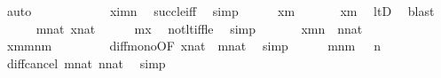 \begin{isabellebody}
\ auto\isanewline
\ \ \ \ \isamarkupfalse%
\ \isanewline
\ \ \ \ \isamarkupfalse%
\ {\isachardoublequoteopen}x{\isacharhash}{\kern0pt}{\isacharplus}{\kern0pt}i{\isacharless}{\kern0pt}m{\isacharhash}{\kern0pt}{\isacharplus}{\kern0pt}n{\isachardoublequoteclose}\ \isamarkupfalse%
\ succ{\isacharunderscore}{\kern0pt}le{\isacharunderscore}{\kern0pt}iff\ \isamarkupfalse%
\ simp\isanewline
\ \ \ \ \isamarkupfalse%
\ {\isacartoucheopen}x{\isasymnotin}m{\isacartoucheclose}\ \isanewline
\ \ \ \ \isamarkupfalse%
\ {\isachardoublequoteopen}{\isasymnot}x{\isacharless}{\kern0pt}m{\isachardoublequoteclose}\ \isamarkupfalse%
\ ltD\ \isamarkupfalse%
\ blast\isanewline
\ \ \ \ \isamarkupfalse%
\ {\isacartoucheopen}m{\isasymin}nat{\isacartoucheclose}\ {\isacartoucheopen}x{\isasymin}nat{\isacartoucheclose}\isanewline
\ \ \ \ \isamarkupfalse%
\ {\isachardoublequoteopen}m{\isasymle}x{\isachardoublequoteclose}\ \isamarkupfalse%
\ not{\isacharunderscore}{\kern0pt}lt{\isacharunderscore}{\kern0pt}iff{\isacharunderscore}{\kern0pt}le\ \isamarkupfalse%
\ simp\ \isanewline
\ \ \ \ \isamarkupfalse%
\ {\isacartoucheopen}x{\isacharless}{\kern0pt}m{\isacharhash}{\kern0pt}{\isacharplus}{\kern0pt}n{\isacartoucheclose}\ \ {\isacartoucheopen}n{\isasymin}nat{\isacartoucheclose}\isanewline
\ \ \ \ \isamarkupfalse%
\ {\isachardoublequoteopen}x{\isacharhash}{\kern0pt}{\isacharminus}{\kern0pt}m{\isacharless}{\kern0pt}m{\isacharhash}{\kern0pt}{\isacharplus}{\kern0pt}n{\isacharhash}{\kern0pt}{\isacharminus}{\kern0pt}m{\isachardoublequoteclose}\ \isanewline
\ \ \ \ \ \ \isamarkupfalse%
\ diff{\isacharunderscore}{\kern0pt}mono{\isacharbrackleft}{\kern0pt}OF\ {\isacartoucheopen}x{\isasymin}nat{\isacartoucheclose}\ {\isacharunderscore}{\kern0pt}\ {\isacartoucheopen}m{\isasymin}nat{\isacartoucheclose}{\isacharbrackright}{\kern0pt}\ \isamarkupfalse%
\ simp\isanewline
\ \ \ \ \isamarkupfalse%
\ {\isachardoublequoteopen}m{\isacharhash}{\kern0pt}{\isacharplus}{\kern0pt}n{\isacharhash}{\kern0pt}{\isacharminus}{\kern0pt}m\ {\isacharequal}{\kern0pt}\ \ n{\isachardoublequoteclose}\ \isamarkupfalse%
\ diff{\isacharunderscore}{\kern0pt}cancel{}\ {\isacartoucheopen}m{\isasymin}nat{\isacartoucheclose}\ {\isacartoucheopen}n{\isasymin}nat{\isacartoucheclose}\ \isamarkupfalse%
\ simp\ \ \ \isanewline

\end{isabellebody}
